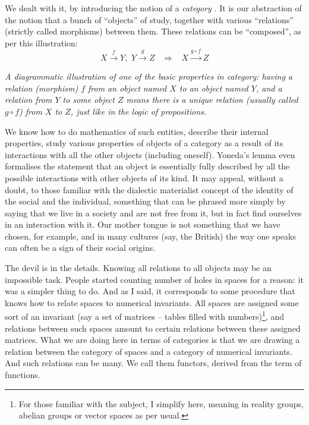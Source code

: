 \documentclass{article}
\begin{document}
We dealt with it, by introducing the notion of a \emph{category} \cite{EILMAC,MACLANE}. It is our abstraction of the notion that a bunch of “objects” of study, together with various “relations” (strictly called morphisms) between them. These relations can be ``composed'', as per this illustration:
$$
X \stackrel f \longrightarrow Y, \, \, Y \stackrel g \longrightarrow Z \, \, \, \, \, \Rightarrow \, \, \, \, \, X \stackrel{g \circ f}{\longrightarrow} Z
$$
\begin{center}
\textit{A diagrammatic illustration of one of the basic properties in category: having a relation (morphism) $f$ from an object named $X$ to an object named $Y$, and a relation from $Y$ to some object $Z$ means there is a unique relation (usually called $g \circ f$) from $X$ to $Z$, just like in the logic of propositions.}
\end{center}

We know how to do mathematics of such entities, describe their internal properties, study various properties of objects of a category as a result of its interactions with all the other objects (including oneself).
Yoneda’s lemma \cite{MACLANE} even formalises the statement that an object is essentially fully described by all the possible interactions with other objects of its kind. It may appeal, without a doubt, to those familiar with the dialectic materialist concept of the identity of the social and the individual, something that can be phrased more simply by saying that we live in a society and are not free from it, but in fact find ourselves in an interaction with it. Our mother tongue is not something that we have chosen, for example, and in many cultures (say, the British) the way one speaks can often be a sign of their social origins.

The devil is in the details. Knowing all relations to all objects may be an impossible task. People started counting number of holes in spaces for a reason: it was a simpler thing to do. And as I said, it corresponds to some procedure that knows how to relate spaces to numerical invariants. All spaces are assigned some sort of an invariant (say a set of matrices – tables filled with numbers)\footnote{For those familiar with the subject, I simplify here, meaning in reality groups, abelian groups or vector spaces as per usual.}, and relations between such spaces amount to certain relations between these assigned matrices. What we are doing here in terms of categories is that we are drawing a relation between the category of spaces and a category of numerical invariants. And such relations can be many. We call them functors, derived from the term of functions.
\end{document}
